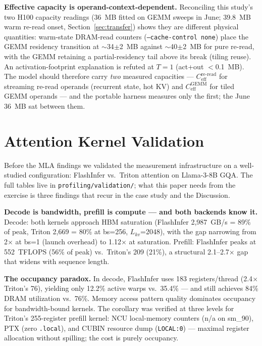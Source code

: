 \documentclass[10pt,twocolumn]{article}
\begin{document}
\textbf{Effective capacity is operand-context-dependent.}  Reconciling this study's two H100 capacity readings (36~MB fitted on GEMM sweeps in June; 39.8~MB warm re-read onset, Section~\ref{sec:transfer}) shows they are different physical quantities: warm-state DRAM-read counters (\texttt{--cache-control none}) place the GEMM residency transition at $\sim$34$\pm$2~MB against $\sim$40$\pm$2~MB for pure re-read, with the GEMM retaining a partial-residency tail above its break (tiling reuse).  An activation-footprint explanation is refuted at $T{=}1$ (act+out $<$0.1~MB).  The model should therefore carry \emph{two} measured capacities --- $C_\text{eff}^\text{re-read}$ for streaming re-read operands (recurrent state, hot KV) and $C_\text{eff}^\text{GEMM}$ for tiled GEMM operands --- and the portable harness measures only the first; the June 36~MB sat between them.

\section{Attention Kernel Validation}
\label{sec:validation}

Before the MLA findings we validated the measurement infrastructure on a well-studied configuration: FlashInfer vs.\ Triton attention on Llama-3-8B GQA.  The full tables live in \texttt{profiling/validation/}; what this paper needs from the exercise is three findings that recur in the case study and the Discussion.

\textbf{Decode is bandwidth, prefill is compute --- and both backends know it.}
Decode: both kernels approach HBM saturation (FlashInfer 2{,}987~GB/s = 89\% of peak, Triton 2{,}669 = 80\% at bs=256, $L_{kv}$=2048), with the gap narrowing from 2$\times$ at bs=1 (launch overhead) to 1.12$\times$ at saturation.  Prefill: FlashInfer peaks at 552~TFLOPS (56\% of peak) vs.\ Triton's 209 (21\%), a structural 2.1--2.7$\times$ gap that widens with sequence length.

\textbf{The occupancy paradox.}  In decode, FlashInfer uses 183 registers/thread (2.4$\times$ Triton's 76), yielding only 12.2\% active warps vs.\ 35.4\% --- and still achieves 84\% DRAM utilization vs.\ 76\%.  Memory access pattern quality dominates occupancy for bandwidth-bound kernels.  The corollary was verified at three levels for Triton's 255-register prefill kernel: NCU local-memory counters (n/a on sm\_90), PTX (zero \texttt{.local}), and CUBIN resource dump (\texttt{LOCAL:0}) --- maximal register allocation without spilling; the cost is purely occupancy.
\end{document}
